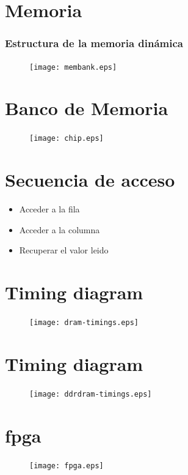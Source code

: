 \documentclass{beamer}
\begin{document}
\section{Memoria}
\begin{frame}
\frametitle{Estructura de la  memoria dinámica}
\begin{figure}[!htb]
\centering
\texttt{[image: membank.eps]}
\end{figure}
\end{frame}

\section{Banco de Memoria}
\begin{frame}
\begin{figure}[!htb]
\centering
\texttt{[image: chip.eps]}
\end{figure}
\end{frame}

\section{Secuencia de acceso}
\begin{frame}
	\begin{itemize}
		\item Acceder a la fila
		\item Acceder a la columna
		\item Recuperar el valor leido
	\end{itemize}
\end{frame}

\section{Timing diagram}
\begin{frame}
\begin{figure}[!htb]
\centering
\texttt{[image: dram-timings.eps]}
\end{figure}
\end{frame}

\section{Timing diagram}
\begin{frame}
\begin{figure}[!htb]
\centering
\texttt{[image: ddrdram-timings.eps]}
\end{figure}
\end{frame}

\section{fpga}
\begin{frame}
\begin{figure}[!htb]
\centering
\texttt{[image: fpga.eps]}
\end{figure}
\end{frame}
\end{document}
